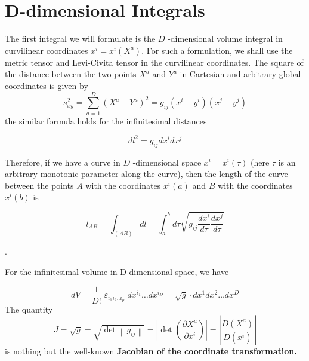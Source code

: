 \section{D-dimensional Integrals}
The first integral we will formulate is the $D$ -dimensional volume integral in curvilinear coordinates $x^{i}=x^{i}\left(X^{a}\right) .$ For such a formulation, we shall use the metric tensor and Levi-Civita tensor in the curvilinear coordinates. The square of the distance between the two points $X^{a}$ and $Y^{a}$ in Cartesian and arbitrary global coordinates is given by
$$
s_{x y}^{2}=\sum_{a=1}^{D}\left(X^{a}-Y^{a}\right)^{2}=g_{i j}\left(x^{i}-y^{i}\right)\left(x^{j}-y^{j}\right)
$$
the similar formula holds for the infinitesimal distances
\begin{qt}
\begin{equation}
d l^{2}=g_{i j} d x^{i} d x^{j}
\end{equation}
\end{qt}
Therefore, if we have a curve in $D$ -dimensional space $x^{i}=x^{i}(\tau)$ (here $\tau$ is an arbitrary monotonic parameter along the curve), then the length of the curve between the points $A$ with the coordinates $x^{i}(a)$ and $B$ with the coordinates $x^{i}(b)$ is
\begin{qt}
\begin{equation}
l_{A B}=\int_{(A B)} d l=\int_{a}^{b} d \tau \sqrt{g_{i j} \frac{d x^{i}}{d \tau} \frac{d x^{j}}{d \tau}}
\end{equation}
\end{qt}
.

For the infinitesimal volume in D-dimensional space, we have
\begin{qt}
\begin{equation}
d V=\frac{1}{D !}\left|\varepsilon_{i_{1} i_{2} . . i_{p}}\right| d x^{i_{1}} \ldots d x^{i_{D}}=\sqrt{g} \cdot d x^{1} d x^{2} \ldots d x^{D}
\end{equation}
The quantity
\begin{equation}
J=\sqrt{g}=\sqrt{\operatorname{det}\left\|g_{i j}\right\|}=\left|\operatorname{det}\left(\frac{\partial X^{a}}{\partial x^{i}}\right)\right|=\left|\frac{D\left(X^{a}\right)}{D\left(x^{i}\right)}\right|
\end{equation}
is nothing but the well-known \textbf{Jacobian of the coordinate transformation.}
\end{qt}

